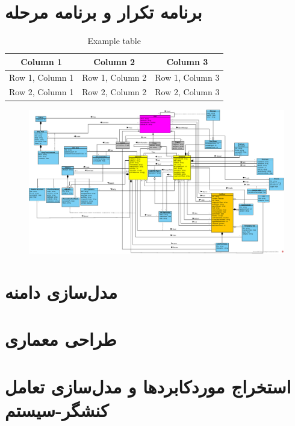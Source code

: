 \documentclass[12pt]{article}
\begin{document}
	\newpage
	\section{برنامه تکرار و برنامه مرحله}
	\begin{table}[h]
		\centering\begin{tabular}{|c|c|c|}
			\hline
			Column 1 & Column 2 & Column 3 \\
			\hline
			Row 1, Column 1 & Row 1, Column 2 & Row 1, Column 3 \\
			\hline
			Row 2, Column 1 & Row 2, Column 2 & Row 2, Column 3 \\
			\hline
		\end{tabular}
		\caption{Example table}
		\label{tab:example}
	\end{table}

	\begin{figure}
		\centering
		\includegraphics[width=1.5\linewidth]{files/Project_OOAD_Phase2_DiagramClass_V5_EnglishVersion}
		\caption{}
		\label{fig:projectooadphase2diagramclassv5englishversion}
	\end{figure}

	\newpage
	\section{مدل‌سازی دامنه}
	\newpage
	\section{طراحی معماری}

	\newpage
	\section{استخراج موردکابردها و مدل‌سازی تعامل کنشگر-سیستم}
\end{document}
